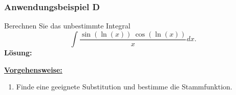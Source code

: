 \newpage

\subsubsection*{Anwendungsbeispiel D}
Berechnen Sie das unbestimmte Integral
\begin{equation*}
\int \frac{\sin(\ln(x)) \ \cos(\ln(x))}{x} dx.
\end{equation*}
\textbf{Lösung:}
\begin{mdframed}
\underline{\textbf{Vorgehensweise:}}
\begin{enumerate}
\item Finde eine geeignete Substitution und bestimme die Stammfunktion.
\end{enumerate}
\end{mdframed}

